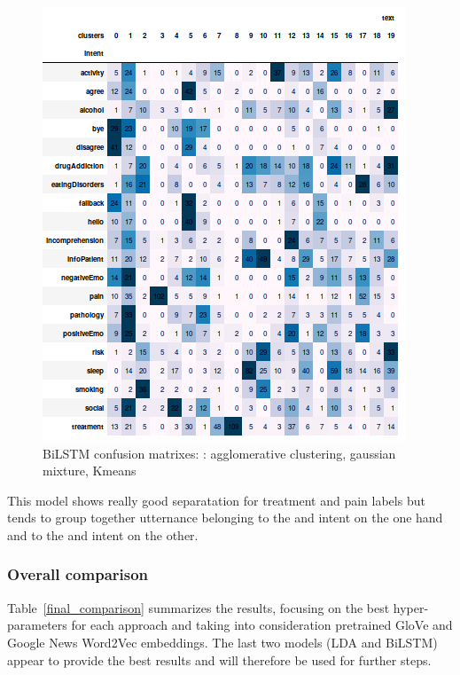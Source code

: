 \documentclass[11pt]{article}
\begin{document}
\begin{figure}[h]
	\includegraphics[scale=0.28]{bilstm_km_cm.png}
	\caption{BiLSTM confusion matrixes: : agglomerative clustering, gaussian mixture, Kmeans}
\label{lda_gm_cm}
\end{figure}
\FloatBarrier

This model shows really good separatation for treatment and pain labels but  
tends to group together utternance belonging to the {} and  {} intent on the one hand and to the  {} and  {} intent on the other.

\subsubsection{Overall comparison}


Table~\ref{final_comparison} summarizes the results, focusing on the best hyper-parameters for each approach and  taking into consideration pretrained GloVe and Google News Word2Vec embeddings. The last two models (LDA and BiLSTM) appear to provide the best results and will therefore
be used for further steps.
\end{document}
